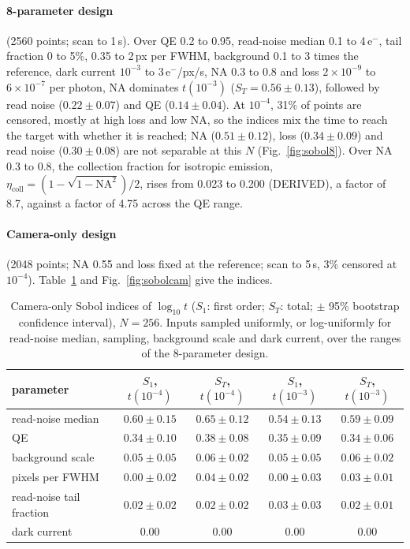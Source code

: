 \documentclass[11pt,a4paper]{article}
\newcommand{\elec}{e$^-$}
\begin{document}
\paragraph{8-parameter design} (2560 points; scan to 1\,s). Over QE 0.2 to 0.95, read-noise median 0.1
to 4\,\elec, tail fraction 0 to 5\%, 0.35 to 2\,px per FWHM, background 0.1 to 3 times the reference,
dark current $10^{-3}$ to 3\,\elec/px/s, NA 0.3 to 0.8 and loss $2\times10^{-9}$ to $6\times10^{-7}$ per
photon, NA dominates $t(10^{-3})$ ($S_T = 0.56 \pm 0.13$), followed by read noise ($0.22 \pm 0.07$) and
QE ($0.14 \pm 0.04$). At $10^{-4}$, 31\% of points are censored, mostly at high loss and low NA, so the
indices mix the time to reach the target with whether it is reached; NA ($0.51 \pm 0.12$), loss
($0.34 \pm 0.09$) and read noise ($0.30 \pm 0.08$) are not separable at this $N$ (Fig.~\ref{fig:sobol8}).
Over NA 0.3 to 0.8, the collection fraction for isotropic emission,
$\eta_\mathrm{coll} = (1 - \sqrt{1 - \mathrm{NA}^2})/2$, rises from 0.023 to 0.200 (DERIVED), a factor of
8.7, against a factor of 4.75 across the QE range.

\paragraph{Camera-only design} (2048 points; NA 0.55 and loss fixed at the reference; scan to 5\,s,
3\% censored at $10^{-4}$). Table~\ref{tab:sobolcam} and Fig.~\ref{fig:sobolcam} give the indices.

\begin{table}[htbp]
\centering
\caption{Camera-only Sobol indices of $\log_{10} t$ ($S_1$: first order; $S_T$: total; $\pm$ 95\%
bootstrap confidence interval), $N = 256$. Inputs sampled uniformly, or log-uniformly for read-noise
median, sampling, background scale and dark current, over the ranges of the 8-parameter design.}
\label{tab:sobolcam}
\small
\begin{tabular}{@{}l c c c c@{}}
\toprule
parameter & $S_1$, $t(10^{-4})$ & $S_T$, $t(10^{-4})$ & $S_1$, $t(10^{-3})$ & $S_T$, $t(10^{-3})$ \\
\midrule
read-noise median & $0.60 \pm 0.15$ & $0.65 \pm 0.12$ & $0.54 \pm 0.13$ & $0.59 \pm 0.09$ \\
QE & $0.34 \pm 0.10$ & $0.38 \pm 0.08$ & $0.35 \pm 0.09$ & $0.34 \pm 0.06$ \\
background scale & $0.05 \pm 0.05$ & $0.06 \pm 0.02$ & $0.05 \pm 0.05$ & $0.06 \pm 0.02$ \\
pixels per FWHM & $0.00 \pm 0.02$ & $0.04 \pm 0.02$ & $0.00 \pm 0.03$ & $0.03 \pm 0.01$ \\
read-noise tail fraction & $0.02 \pm 0.02$ & $0.02 \pm 0.02$ & $0.03 \pm 0.03$ & $0.02 \pm 0.01$ \\
dark current & 0.00 & 0.00 & 0.00 & 0.00 \\
\bottomrule
\end{tabular}
\end{table}
\end{document}
